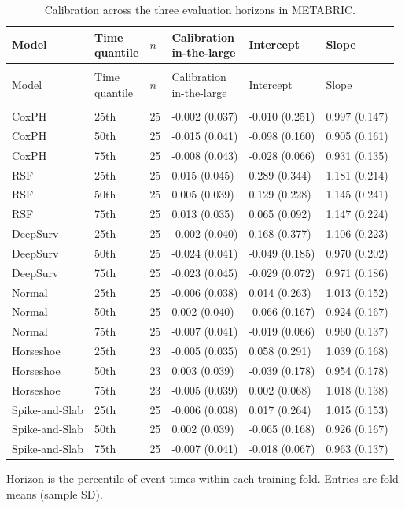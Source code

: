 \begin{longtable}{@{}>{\raggedright\arraybackslash}p{3.1cm}>{\raggedright\arraybackslash}p{1.3cm}p{0.5cm}p{2.9cm}p{2.9cm}p{2.9cm}@{}}
\caption{Calibration across the three evaluation horizons in METABRIC.}\label{tab:calibration-all-metabric}\\
\toprule Model & \shortstack[l]{Time\\quantile} & $n$ & \shortstack[l]{Calibration\\in-the-large} & Intercept & Slope \\\midrule\endfirsthead
\multicolumn{6}{l}{\tablename\ \thetable\ (continued)}\\
\toprule Model & \shortstack[l]{Time\\quantile} & $n$ & \shortstack[l]{Calibration\\in-the-large} & Intercept & Slope \\\midrule\endhead
\midrule\multicolumn{6}{r}{Continued on next page}\\\endfoot
\bottomrule\endlastfoot
CoxPH & 25th & 25 & -0.002 (0.037) & -0.010 (0.251) & 0.997 (0.147) \\
CoxPH & 50th & 25 & -0.015 (0.041) & -0.098 (0.160) & 0.905 (0.161) \\
CoxPH & 75th & 25 & -0.008 (0.043) & -0.028 (0.066) & 0.931 (0.135) \\
RSF & 25th & 25 & 0.015 (0.045) & 0.289 (0.344) & 1.181 (0.214) \\
RSF & 50th & 25 & 0.005 (0.039) & 0.129 (0.228) & 1.145 (0.241) \\
RSF & 75th & 25 & 0.013 (0.035) & 0.065 (0.092) & 1.147 (0.224) \\
DeepSurv & 25th & 25 & -0.002 (0.040) & 0.168 (0.377) & 1.106 (0.223) \\
DeepSurv & 50th & 25 & -0.024 (0.041) & -0.049 (0.185) & 0.970 (0.202) \\
DeepSurv & 75th & 25 & -0.023 (0.045) & -0.029 (0.072) & 0.971 (0.186) \\
Normal & 25th & 25 & -0.006 (0.038) & 0.014 (0.263) & 1.013 (0.152) \\
Normal & 50th & 25 & 0.002 (0.040) & -0.066 (0.167) & 0.924 (0.167) \\
Normal & 75th & 25 & -0.007 (0.041) & -0.019 (0.066) & 0.960 (0.137) \\
Horseshoe & 25th & 23 & -0.005 (0.035) & 0.058 (0.291) & 1.039 (0.168) \\
Horseshoe & 50th & 23 & 0.003 (0.039) & -0.039 (0.178) & 0.954 (0.178) \\
Horseshoe & 75th & 23 & -0.005 (0.039) & 0.002 (0.068) & 1.018 (0.138) \\
Spike-and-Slab & 25th & 25 & -0.006 (0.038) & 0.017 (0.264) & 1.015 (0.153) \\
Spike-and-Slab & 50th & 25 & 0.002 (0.039) & -0.065 (0.168) & 0.926 (0.167) \\
Spike-and-Slab & 75th & 25 & -0.007 (0.041) & -0.018 (0.067) & 0.963 (0.137) \\
\end{longtable}
\noindent Horizon is the percentile of event times within each training fold. Entries are fold means (sample SD).\par\endgroup
